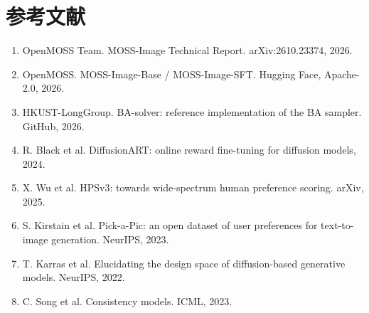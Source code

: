 \documentclass[10.5pt,a4paper]{ctexart}
\begin{document}
\section*{参考文献}
\begin{enumerate}
  \item OpenMOSS Team. MOSS-Image Technical Report. arXiv:2610.23374, 2026.
  \item OpenMOSS. MOSS-Image-Base / MOSS-Image-SFT. Hugging Face, Apache-2.0, 2026.
  \item HKUST-LongGroup. BA-solver: reference implementation of the BA sampler. GitHub, 2026.
  \item R. Black et al. DiffusionART: online reward fine-tuning for diffusion models, 2024.
  \item X. Wu et al. HPSv3: towards wide-spectrum human preference scoring. arXiv, 2025.
  \item S. Kirstain et al. Pick-a-Pic: an open dataset of user preferences for text-to-image generation. NeurIPS, 2023.
  \item T. Karras et al. Elucidating the design space of diffusion-based generative models. NeurIPS, 2022.
  \item C. Song et al. Consistency models. ICML, 2023.
\end{enumerate}
\end{document}
